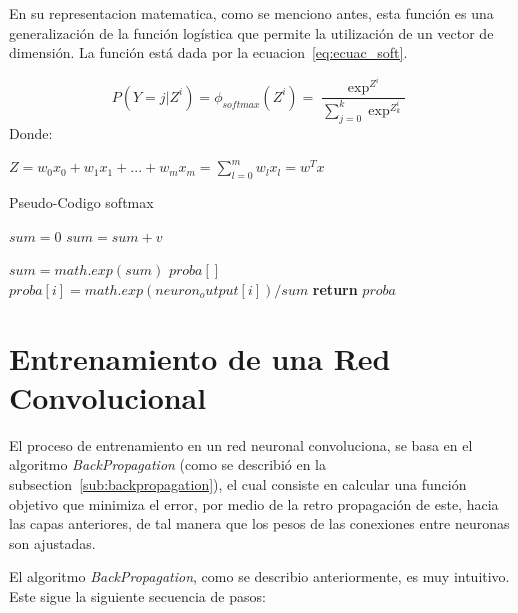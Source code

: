 En su representacion matematica, como se menciono antes, esta función es una generalización de la función logística que permite la utilización de un vector de dimensión. La función está dada por la ecuacion~\ref{eq:ecuac_soft}.

\begin{equation}\label{eq:ecuac_soft}
P(Y = j|Z^i) = \phi_{softmax}(Z^i)= \frac{\exp^{Z^i}}{\sum^k_{j=0}\exp^{Z^{i}_k}}
\end{equation}
Donde:

\begin{center} $Z = w_{0}x_{0} + w_{1}x_{1} +...+w_{m}x_{m} = \sum_{l=0}^m w_{l}x_{l} = w^Tx$\end{center}

\begin{algorithm}
\caption{Pseudo-Codigo softmax}\label{alg:euclid}

\begin{algorithmic}[H]

\State $sum = 0$
	\State $sum =sum + v$
\EndFor

\State $sum = math.exp(sum) $
\State $proba[]$
	\State $proba[i] = math.exp(neuron_output[i])/sum$
\EndFor
\State \textbf{return} $proba$
\EndProcedure
\end{algorithmic}
\end{algorithm}

\section{Entrenamiento de una Red Convolucional}

El proceso de entrenamiento en un red neuronal convoluciona, se basa en el algoritmo \textit{BackPropagation} (como se describió en la subsection~\ref{sub:backpropagation}), el cual consiste en calcular una función objetivo que minimiza el error, por medio de la retro propagación de este, hacia las capas anteriores, de tal manera que los pesos de las conexiones entre neuronas son ajustadas.

El algoritmo \textit{BackPropagation}, como se describio anteriormente, es muy intuitivo. Este sigue la siguiente secuencia de pasos:

